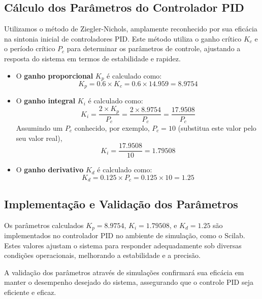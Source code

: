 \subsection{Cálculo dos Parâmetros do Controlador PID}
Utilizamos o método de Ziegler-Nichols, amplamente reconhecido por sua eficácia na sintonia inicial de controladores PID. Este método utiliza o ganho crítico \( K_c \) e o período crítico \( P_c \) para determinar os parâmetros de controle, ajustando a resposta do sistema em termos de estabilidade e rapidez.

\begin{itemize}
    \item O \textbf{ganho proporcional} \( K_p \) é calculado como:
    \[
    K_p = 0.6 \times K_c = 0.6 \times 14.959 = 8.9754
    \]

    \item O \textbf{ganho integral} \( K_i \) é calculado como:
    \[
    K_i = \frac{2 \times K_p}{P_c} = \frac{2 \times 8.9754}{P_c} = \frac{17.9508}{P_c}
    \]
    Assumindo um \( P_c \) conhecido, por exemplo, \( P_c = 10 \) (substitua este valor pelo seu valor real),
    \[
    K_i = \frac{17.9508}{10} = 1.79508
    \]

    \item O \textbf{ganho derivativo} \( K_d \) é calculado como:
    \[
    K_d = 0.125 \times P_c = 0.125 \times 10 = 1.25
    \]
\end{itemize}

\subsection{Implementação e Validação dos Parâmetros}
Os parâmetros calculados \( K_p = 8.9754 \), \( K_i = 1.79508 \), e \( K_d = 1.25 \) são implementados no controlador PID no ambiente de simulação, como o Scilab. Estes valores ajustam o sistema para responder adequadamente sob diversas condições operacionais, melhorando a estabilidade e a precisão.

A validação dos parâmetros através de simulações confirmará sua eficácia em manter o desempenho desejado do sistema, assegurando que o controle PID seja eficiente e eficaz.

